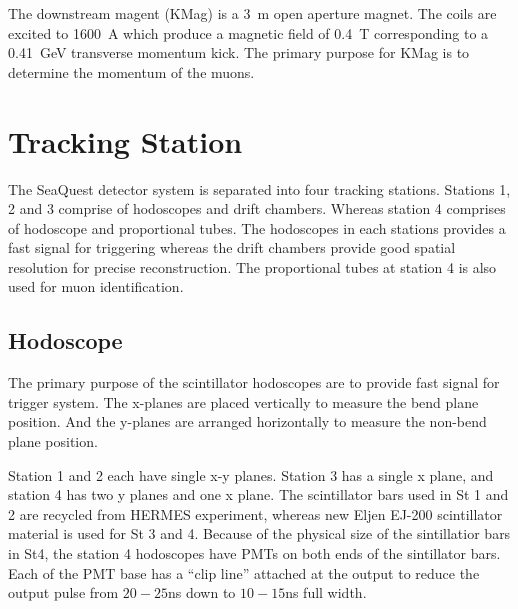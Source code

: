 \documentclass[../main.tex]{subfiles}
\begin{document}
The downstream magent (KMag) is a \SI{3}{\meter} open aperture magnet. The coils are excited
to \SI{1600}{\ampere} which produce a magnetic field of \SI{0.4}{\tesla} corresponding to a
\SI{0.41}{\GeV} transverse momentum kick. The primary purpose for KMag is to determine
the momentum of the muons.

\section{Tracking Station}
The SeaQuest detector system is separated into four tracking stations. Stations \num{1},
\num{2} and \num{3} comprise of hodoscopes and drift chambers. Whereas station \num{4}
comprises of hodoscope and proportional tubes. The hodoscopes in each stations provides
a fast signal for triggering whereas the drift chambers provide good spatial resolution
for precise reconstruction. The proportional tubes at station 4 is also used for muon
identification.

\subsection{Hodoscope}
The primary purpose of the scintillator hodoscopes are to provide fast signal for
trigger system. The x-planes are placed vertically to measure the bend plane position.
And the y-planes are arranged horizontally to measure the non-bend plane position.

Station 1 and 2 each have single x-y planes. Station 3 has a single x plane, and station
4 has two y planes and one x plane. The scintillator bars used in St 1 and 2 are recycled
from HERMES experiment, whereas new Eljen EJ-200 scintillator material
is used for St 3 and 4. Because of the physical size of the sintillatior bars in St4, the station 4
hodoscopes have PMTs on both ends of the sintillator bars. Each of the PMT base has a
``clip line'' attached at the output to reduce the output pulse from $20-25$\unit{\ns}
down to $10-15$\unit{\ns} full width.
\end{document}
